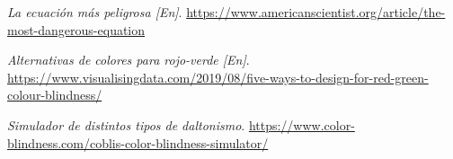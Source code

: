 \documentclass[titlepage,a4paper]{article}
\begin{document}
\newpage

\begin{thebibliography}{9}

\cprotect\textit{La ecuación más peligrosa [En]}. 
\href {https://www.americanscientist.org/article/the-most-dangerous-equation}{
https://www.americanscientist.org/article/the-most-dangerous-equation
}

\cprotect\textit{Alternativas de colores para rojo-verde [En]}. 
\href {https://www.visualisingdata.com/2019/08/five-ways-to-design-for-red-green-colour-blindness/}{
https://www.visualisingdata.com/2019/08/five-ways-to-design-for-red-green-colour-blindness/
}

\cprotect\textit{Simulador de distintos tipos de daltonismo}. 
\href {https://www.color-blindness.com/coblis-color-blindness-simulator/}{
https://www.color-blindness.com/coblis-color-blindness-simulator/
}
\end{thebibliography}
\end{document}
